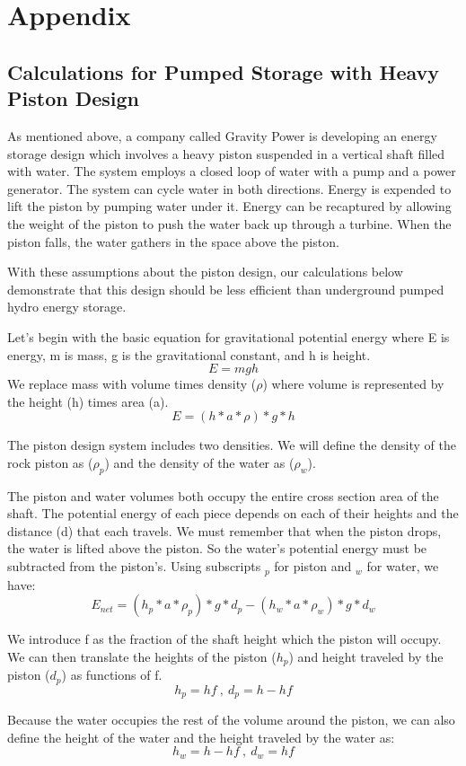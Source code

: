 \section{Appendix}

\subsection{Calculations for Pumped Storage with Heavy Piston Design}
As mentioned above, a company called Gravity Power is developing an energy storage design which involves a heavy piston suspended in a vertical shaft filled with water. The system employs a closed loop of water with a pump and a power generator. The system can cycle water in both directions. Energy is expended to lift the piston by pumping water under it. Energy can be recaptured by allowing the weight of the piston to push the water back up through a turbine. When the piston falls, the water gathers in the space above the piston.

With these assumptions about the piston design, our calculations below demonstrate that this design should be less efficient than underground pumped hydro energy storage.

Let's begin with the basic equation for gravitational potential energy where E is energy, m is mass, g is the gravitational constant, and h is height.
\[ E = mgh \]
We replace mass with volume times density ($\rho$) where volume is represented by the height (h) times area (a).
\[ E = (h*a*\rho)*g*h \]

The piston design system includes two densities. We will define the density of the rock piston as ($\rho_p$) and the density of the water as ($\rho_w$).

The piston and water volumes both occupy the entire cross section area of the shaft. The potential energy of each piece depends on each of their heights and the distance (d) that each travels. We must remember that when the piston drops, the water is lifted above the piston. So the water's potential energy must be subtracted from the piston's. Using subscripts $_p$ for piston and $_w$ for water, we have:
\[ E_{net} = (h_p*a*\rho_p)*g*d_p - (h_w*a*\rho_w)*g*d_w  \]

We introduce f as the fraction of the shaft height which the piston will occupy. We can then translate the heights of the piston ($h_p$) and height traveled by the piston ($d_p$) as functions of f.
\[ h_p = hf \ , \ d_p = h-hf \]

Because the water occupies the rest of the volume around the piston, we can also define the height of the water and the height traveled by the water as:
\[ h_w = h-hf\ , \ d_w = hf \]

